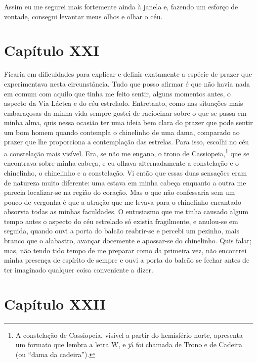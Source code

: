 Assim eu me segurei mais fortemente ainda à janela e, fazendo um
esforço de vontade, consegui levantar meus olhos e olhar o céu. 

\section*{Capítulo XXI}

 Ficaria em dificuldades para explicar e definir exatamente a espécie de
prazer que experimentava nesta circunstância. Tudo que posso afirmar é
que não havia nada em comum com aquilo que tinha me feito sentir,
alguns momentos antes, o aspecto da Via Láctea e do céu estrelado.
Entretanto, como nas situações mais embaraçosas da minha vida sempre
gostei de raciocinar sobre o que se passa em minha alma, quis nessa
ocasião ter uma ideia bem clara do prazer que pode sentir um bom homem
quando contempla o chinelinho de uma dama, comparado ao prazer que lhe
proporciona a contemplação das estrelas. Para isso, escolhi no céu a
constelação mais visível. Era, se não me engano, o trono de
Cassiopeia,\footnote{ A constelação de Cassiopeia, visível a partir do
hemisfério norte, apresenta um formato que lembra a letra W, e já foi
chamada de Trono e de Cadeira (ou ``dama da cadeira'').} que se
encontrava sobre minha cabeça, e eu olhava alternadamente a constelação
e o chinelinho, o chinelinho e a constelação. Vi então que essas duas
sensações eram de natureza muito diferente: uma estava em minha cabeça
enquanto a outra me parecia localizar-se na região do coração. Mas o
que não confessaria sem um pouco de vergonha é que a atração que me
levava para o chinelinho encantado absorvia todas as minhas faculdades.
O entusiasmo que me tinha causado algum tempo antes o aspecto do céu
estrelado só existia fragilmente, e anulou-se em seguida, quando ouvi a
porta do balcão reabrir-se e percebi um pezinho, mais branco que o
alabastro, avançar docemente e apossar-se do chinelinho. Quis falar;
mas, não tendo tido tempo de me preparar como da primeira vez, não
encontrei minha presença de espírito de sempre e ouvi a porta do balcão
se fechar antes de ter imaginado qualquer coisa conveniente a dizer.

\section*{Capítulo XXII}

